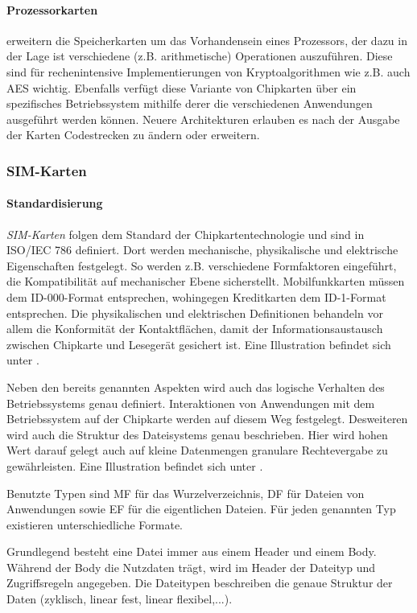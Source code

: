 \paragraph{Prozessorkarten} erweitern die Speicherkarten um das Vorhandensein
eines Prozessors, der dazu in der Lage ist verschiedene (z.B. arithmetische)
Operationen auszuführen. Diese sind für rechenintensive Implementierungen
von Kryptoalgorithmen wie z.B. auch AES wichtig. Ebenfalls verfügt diese
Variante von Chipkarten über ein spezifisches Betriebssystem mithilfe derer
die verschiedenen Anwendungen ausgeführt werden können.
Neuere Architekturen erlauben es nach der Ausgabe der Karten Codestrecken
zu ändern oder erweitern.

\subsubsection{SIM-Karten}

\paragraph{Standardisierung}
\textit{SIM-Karten} folgen dem Standard der Chipkartentechnologie und sind in
ISO/IEC 786 definiert. Dort werden mechanische, physikalische und elektrische
Eigenschaften festgelegt.
So werden z.B. verschiedene Formfaktoren eingeführt, die Kompatibilität
auf mechanischer Ebene sicherstellt. Mobilfunkkarten müssen dem ID-000-Format
entsprechen, wohingegen Kreditkarten dem ID-1-Format entsprechen. Die physikalischen und elektrischen
Definitionen behandeln vor allem die Konformität der Kontaktflächen, damit
der Informationsaustausch zwischen Chipkarte und Lesegerät gesichert ist.
Eine Illustration befindet sich unter .

Neben den bereits genannten Aspekten wird auch das logische Verhalten des Betriebssystems
genau definiert. Interaktionen von Anwendungen mit dem Betriebssystem auf der Chipkarte
werden auf diesem Weg festgelegt. Desweiteren wird auch die Struktur des Dateisystems
genau beschrieben. Hier wird hohen Wert darauf gelegt auch auf kleine Datenmengen
granulare Rechtevergabe zu gewährleisten.
Eine Illustration befindet sich unter .

Benutzte Typen sind \ac{MF} für das Wurzelverzeichnis,
\ac{DF} für Dateien von Anwendungen sowie
\ac{EF} für die eigentlichen Dateien. Für jeden genannten Typ
existieren unterschiedliche Formate.

Grundlegend besteht eine Datei immer aus einem Header und einem Body. Während
der Body die Nutzdaten trägt, wird im Header der Dateityp und Zugriffsregeln
angegeben. Die Dateitypen beschreiben die genaue Struktur der Daten (zyklisch, linear fest,
linear flexibel,...).

